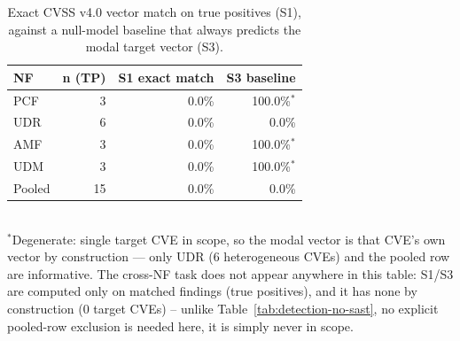 \begin{table}[t]
\centering
\caption{Exact CVSS v4.0 vector match on true positives (S1), against a null-model baseline that always predicts the modal target vector (S3).}
\label{tab:s1-s3}
\begin{tabular}{lrrr}
\toprule
NF & n (TP) & S1 exact match & S3 baseline \\
\midrule
PCF & 3  & 0.0\% & 100.0\%$^{*}$ \\
UDR & 6  & 0.0\% & 0.0\%  \\
AMF & 3  & 0.0\% & 100.0\%$^{*}$ \\
UDM & 3  & 0.0\% & 100.0\%$^{*}$ \\
\midrule
Pooled & 15 & 0.0\% & 0.0\% \\
\bottomrule
\end{tabular}
\\[2pt]
\footnotesize{$^{*}$Degenerate: single target CVE in scope, so the modal vector is that CVE's own vector by construction — only UDR (6 heterogeneous CVEs) and the pooled row are informative. The cross-NF task does not appear anywhere in this table: S1/S3 are computed only on matched findings (true positives), and it has none by construction (0 target CVEs) -- unlike Table~\ref{tab:detection-no-sast}, no explicit pooled-row exclusion is needed here, it is simply never in scope.}
\end{table}

